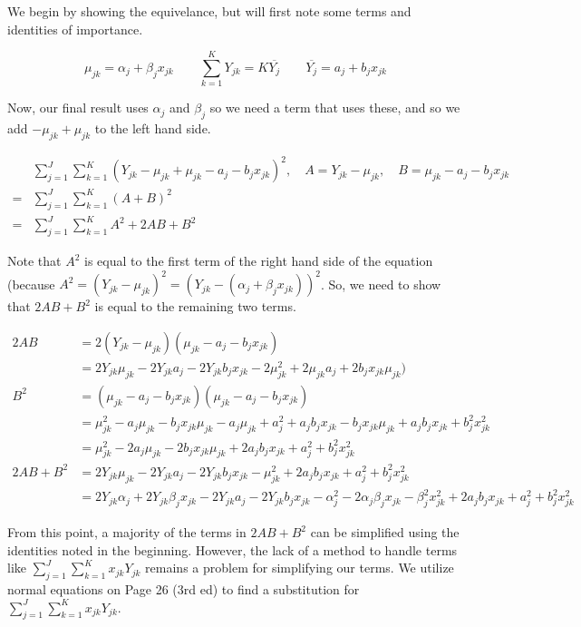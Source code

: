 \documentclass[]{article}
\begin{document}
We begin by showing the equivelance, but will first note some terms and
identities of importance.

\[
\mu_{jk} = \alpha_j + \beta_jx_{jk} \quad \quad \sum_{k=1}^KY_{jk} = K\overline{Y_j} \quad\quad \overline{Y_j} = a_j + b_jx_{jk}
\]

Now, our final result uses \(\alpha_j\) and \(\beta_j\) so we need a
term that uses these, and so we add \(-\mu_{jk} + \mu_{jk}\) to the left
hand side.

\begin{align*}
& \sum_{j=1}^J\sum_{k=1}^K(Y_{jk} - \mu_{jk} + \mu_{jk} - a_j - b_jx_{jk})^2, \quad A = Y_{jk} - \mu_{jk}, \quad B = \mu_{jk} - a_j - b_jx_{jk}\\
= & \sum_{j=1}^J\sum_{k=1}^K(A+B)^2\\
= & \sum_{j=1}^J\sum_{k=1}^KA^2 + 2AB + B^2
\end{align*}

Note that \(A^2\) is equal to the first term of the right hand side of
the equation (because
\(A^2 = (Y_{jk} - \mu_{jk})^2 = (Y_{jk} - (\alpha_j + \beta_jx_{jk}))^2\).
So, we need to show that \(2AB + B^2\) is equal to the remaining two
terms.

\begin{align*}
2AB       &= 2(Y_{jk} - \mu_{jk})(\mu_{jk} - a_j - b_jx_{jk})\\
          &= 2Y_{jk}\mu_{jk} - 2Y_{jk}a_j - 2Y_{jk}b_jx_{jk} - 2\mu_{jk}^2 + 2\mu_{jk}a_j + 2b_jx_{jk}\mu_{jk})\\
B^2       &= (\mu_{jk} - a_j - b_jx_{jk})(\mu_{jk} - a_j - b_jx_{jk})\\
          &= \mu_{jk}^2 - a_j\mu_{jk} - b_jx_{jk}\mu_{jk} - a_j\mu_{jk} + a_j^2 + a_jb_jx_{jk} - b_jx_{jk}\mu_{jk} + a_jb_jx_{jk} + b_j^2x_{jk}^2\\
          &= \mu_{jk}^2 - 2a_j\mu_{jk} - 2b_jx_{jk}\mu_{jk} + 2a_jb_jx_{jk} + a_j^2 + b_j^2x_{jk}^2\\
2AB + B^2 &= 2Y_{jk}\mu_{jk} - 2Y_{jk}a_j - 2Y_{jk}b_jx_{jk} - \mu_{jk}^2 + 2a_jb_jx_{jk} + a_j^2 + b_j^2x_{jk}^2\\
          &= 2Y_{jk}\alpha_j + 2Y_{jk}\beta_jx_{jk} - 2Y_{jk}a_j - 2Y_{jk}b_jx_{jk} - \alpha_j^2 - 2\alpha_j\beta_jx_{jk} - \beta_j^2x_{jk}^2 + 2a_jb_jx_{jk} + a_j^2 + b_j^2x_{jk}^2
\end{align*}

From this point, a majority of the terms in \(2AB + B^2\) can be
simplified using the identities noted in the beginning. However, the
lack of a method to handle terms like
\(\sum_{j=1}^J\sum_{k=1}^K x_{jk}Y_{jk}\) remains a problem for
simplifying our terms. We utilize normal equations on Page 26 (3rd ed)
to find a substitution for \(\sum_{j=1}^J\sum_{k=1}^K x_{jk}Y_{jk}\).
\end{document}
